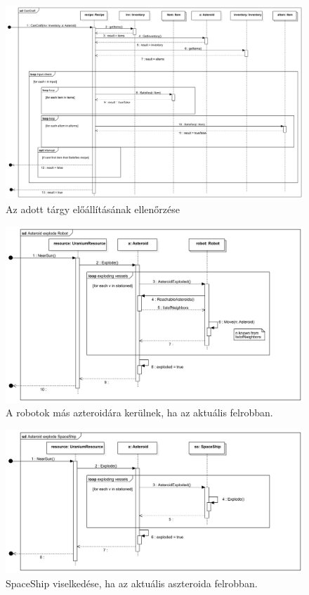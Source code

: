 \begin{figure}[H] 
\centering 
\includegraphics[width=1\textwidth]{docs/3_Project/svg/Design Model!CanCraftSeq!Can Craft!CanCraft_29.png} 
\caption{Az adott tárgy előállításának ellenőrzése} 
\end{figure} 

\begin{figure}[H] 
\centering 
\includegraphics[width=1\textwidth]{docs/3_Project/svg/Design Model!AsteroidExplodeRobo!Interaction1!Asteroid explode Robot_30.png} 
\caption{A robotok más azteroidára kerülnek, ha az aktuális felrobban.} 
\end{figure} 

\begin{figure}[H] 
\centering 
\includegraphics[width=1\textwidth]{docs/3_Project/svg/Design Model!AsteroidExplodeSS!Interaction1!Asteroid explode SpaceShip_31.png} 
\caption{SpaceShip viselkedése, ha az aktuális aszteroida felrobban.} 
\end{figure} 

